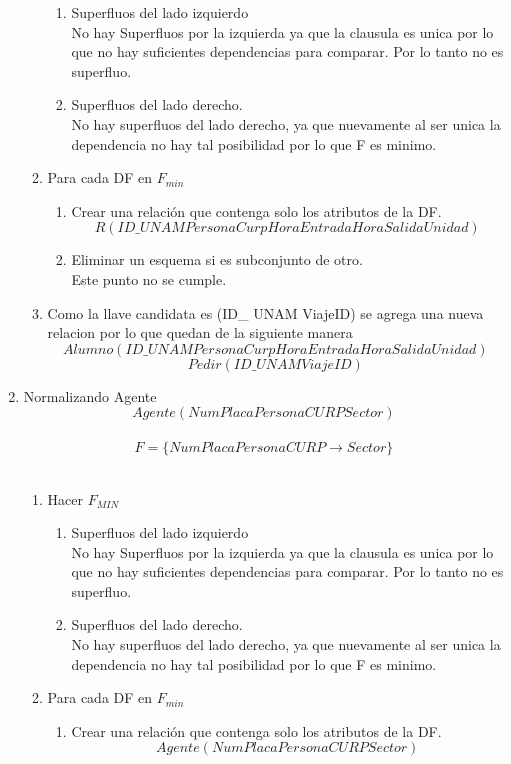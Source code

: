\documentclass{article}
\begin{document}
\begin{enumerate}
\begin{enumerate}
				\begin{enumerate}
					\item Superfluos del lado izquierdo\\
					No hay Superfluos por la izquierda ya que la clausula es unica por lo que no hay suficientes dependencias para comparar.
					Por lo tanto no es superfluo.\\
					\item Superfluos del lado derecho.\\
					No hay superfluos del lado derecho, ya que nuevamente al ser unica la dependencia no hay tal posibilidad por lo que F es minimo.
				\end{enumerate}
				\item Para cada DF en $F_{min}$
				\begin{enumerate}
					\item Crear una relación que contenga solo los atributos de la DF.
					$$R(ID\_ UNAM PersonaCurp HoraEntrada HoraSalida Unidad)$$
					\item Eliminar un esquema si es subconjunto de otro.\\
					Este punto no se cumple.
				\end{enumerate}						
				\item Como la llave candidata es (ID\_ UNAM ViajeID) se agrega una nueva relacion por lo que quedan de la siguiente manera\\
				$$Alumno(ID\_ UNAM PersonaCurp HoraEntrada HoraSalida Unidad)$$
				$$Pedir(ID\_ UNAM ViajeID)$$
			\end{enumerate}	
			\item  Normalizando Agente\\
			
			$$Agente(NumPlaca PersonaCURP Sector)$$\\
			$$F = \lbrace NumPlacaPersonaCURP \rightarrow Sector\rbrace$$\\
			\begin{enumerate}
				\item Hacer $F_{MIN}$\\
				
				\begin{enumerate}
					\item Superfluos del lado izquierdo\\
					No hay Superfluos por la izquierda ya que la clausula es unica por lo que no hay suficientes dependencias para comparar.
					Por lo tanto no es superfluo.\\
					\item Superfluos del lado derecho.\\
					No hay superfluos del lado derecho, ya que nuevamente al ser unica la dependencia no hay tal posibilidad por lo que F es minimo.
				\end{enumerate}
				\item Para cada DF en $F_{min}$
				\begin{enumerate}
					\item Crear una relación que contenga solo los atributos de la DF.
					$$Agente(NumPlaca PersonaCURP Sector)$$
					

\end{enumerate}
\end{enumerate}
\end{enumerate}
\end{document}
